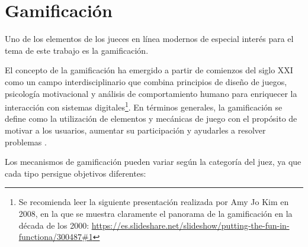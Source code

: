 \section{Gamificación}

Uno de los elementos de los jueces en línea modernos de especial interés para el tema de este trabajo es la gamificación. 

El concepto de la gamificación ha emergido a partir de comienzos del siglo XXI como un campo interdisciplinario que combina principios de diseño de juegos, psicología motivacional y análisis de comportamiento humano para enriquecer la interacción con sistemas digitales\footnote{Se recomienda leer la siguiente presentación realizada por Amy Jo Kim en 2008, en la que se muestra claramente el panorama de la gamificación en la década de los 2000: \url{https://es.slideshare.net/slideshow/putting-the-fun-in-functiona/300487\#1}}. En términos generales, la gamificación se define como la utilización de elementos y mecánicas de juego con el propósito de motivar a los usuarios, aumentar su participación y ayudarles a resolver problemas \citep{Zichermann_Cunningham_2011}.  

Los mecanismos de gamificación pueden variar según la categoría del juez, ya que cada tipo persigue objetivos diferentes:

